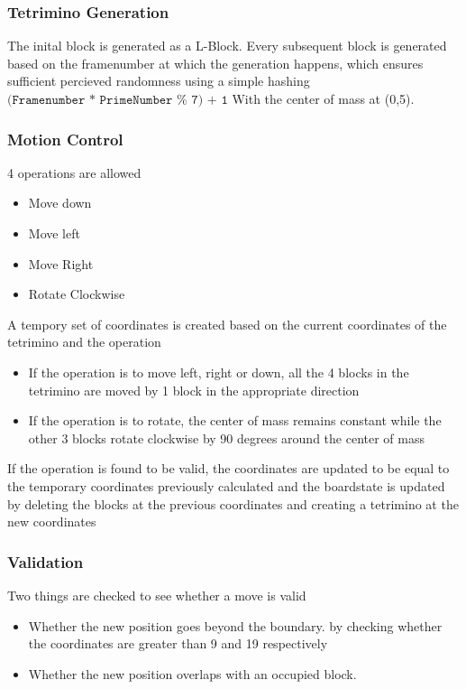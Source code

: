 \subsubsection{Tetrimino Generation }
\label{subsubsection:tetgen}
The inital block is generated as a L-Block. 
Every subsequent block is generated based on the framenumber 
at which the generation happens, which ensures sufficient percieved 
randomness using a simple hashing
 \( \texttt{(Framenumber * PrimeNumber\ \%\ 7) + 1} \) 
With the center of mass at (0,5).
\subsubsection{Motion Control }
\label{subsubsection:motioncontrol}
4 operations are allowed
\begin{itemize}
    \item Move down
    \item Move left
    \item Move Right
    \item Rotate Clockwise
\end{itemize}
 A tempory set of coordinates is created based on the current coordinates of the tetrimino and the operation 
 \begin{itemize}
     \item If the operation is to move left, right or down, all the 4 blocks in the tetrimino are moved by 1 block in the appropriate direction
     \item If the operation is to rotate, the center of mass remains constant while the other 3 blocks rotate clockwise by 90 degrees around the center of mass
 \end{itemize}
 If the operation is found to be valid, the coordinates are updated to
 be equal to the temporary coordinates previously calculated and the boardstate is updated by deleting the blocks at the previous coordinates
 and creating a tetrimino at the new coordinates

\subsubsection{Validation }
\label{subsubsection:validation}
Two things are checked to see whether a move is valid 
\begin{itemize}
    \item Whether the new position goes beyond the boundary. 
    by checking  whether the coordinates are greater than 9 and 19 respectively
    \item Whether the new position overlaps with an occupied block. 
   
\end{itemize}


